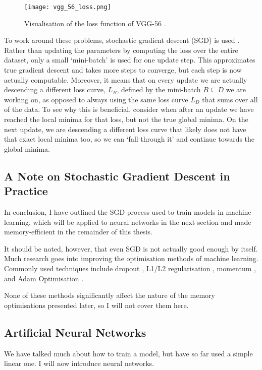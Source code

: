 \begin{figure}[htb]
    \centering
    \texttt{[image: vgg\_56\_loss.png]}
    \caption{Visualisation of the loss function of VGG-56 \cite{Li2018}.}
    \label{fig:2-vgg-loss}
\end{figure}

To work around these problems, stochastic gradient descent (SGD) is used \cite{Bottou2018}. Rather than updating the parameters by computing the loss over the entire dataset, only a small `mini-batch' is used for one update step. This approximates true gradient descent and takes more steps to converge, but each step is now actually computable. Moreover, it means that on every update we are actually descending a different loss curve, \(L_B\), defined by the mini-batch \(B\subseteq D\) we are working on, as opposed to always using the same loss curve \(L_D\) that sums over all of the data. To see why this is beneficial, consider when after an update we have reached the local minima for that loss, but not the true global minima. On the next update, we are descending a different loss curve that likely does not have that exact local minima too, so we can ‘fall through it’ and continue towards the global minima.

\subsection*{A Note on Stochastic Gradient Descent in Practice}
In conclusion, I have outlined the SGD process used to train models in machine learning, which will be applied to neural networks in the next section and made memory-efficient in the remainder of this thesis.

It should be noted, however, that even SGD is not actually good enough by itself.
Much research goes into improving the optimisation methods of machine learning.
Commonly used techniques include dropout \cite{Srivastava2014}, L1/L2 regularisation \cite{Anders1992-weight-decay, Ng2004}, momentum \cite{Sutskever2013}, and Adam Optimisation \cite{Kingma2015-adam}.

None of these methods significantly affect the nature of the memory optimisations presented later, so I will not cover them here.

\subsection{Artificial Neural Networks}
We have talked much about how to train a model, but have so far used a simple linear one.
I will now introduce neural networks.

